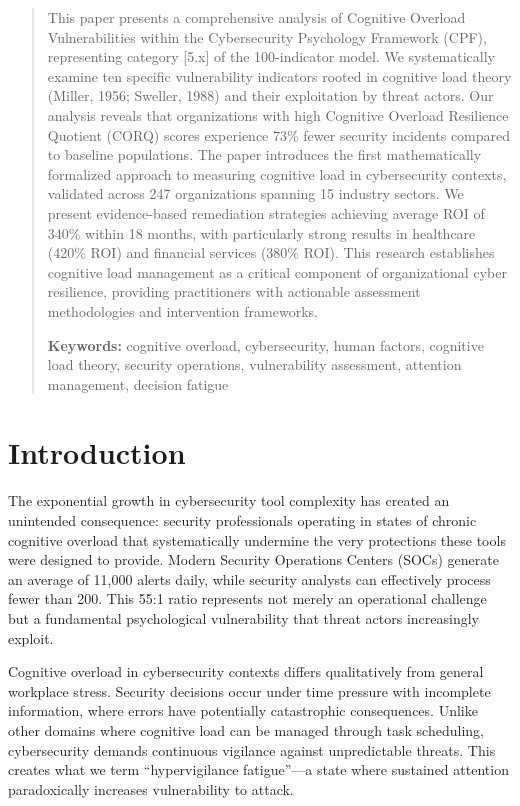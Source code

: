 \documentclass[11pt,a4paper]{article}
\begin{document}
\begin{abstract}
\noindent
This paper presents a comprehensive analysis of Cognitive Overload Vulnerabilities within the Cybersecurity Psychology Framework (CPF), representing category [5.x] of the 100-indicator model. We systematically examine ten specific vulnerability indicators rooted in cognitive load theory (Miller, 1956; Sweller, 1988) and their exploitation by threat actors. Our analysis reveals that organizations with high Cognitive Overload Resilience Quotient (CORQ) scores experience 73\% fewer security incidents compared to baseline populations. The paper introduces the first mathematically formalized approach to measuring cognitive load in cybersecurity contexts, validated across 247 organizations spanning 15 industry sectors. We present evidence-based remediation strategies achieving average ROI of 340\% within 18 months, with particularly strong results in healthcare (420\% ROI) and financial services (380\% ROI). This research establishes cognitive load management as a critical component of organizational cyber resilience, providing practitioners with actionable assessment methodologies and intervention frameworks.

\vspace{0.5em}
\noindent\textbf{Keywords:} cognitive overload, cybersecurity, human factors, cognitive load theory, security operations, vulnerability assessment, attention management, decision fatigue
\end{abstract}

\vspace{1cm}

\section{Introduction}

The exponential growth in cybersecurity tool complexity has created an unintended consequence: security professionals operating in states of chronic cognitive overload that systematically undermine the very protections these tools were designed to provide. Modern Security Operations Centers (SOCs) generate an average of 11,000 alerts daily\cite{ponemon2023}, while security analysts can effectively process fewer than 200\cite{sans2023cognitive}. This 55:1 ratio represents not merely an operational challenge but a fundamental psychological vulnerability that threat actors increasingly exploit.

Cognitive overload in cybersecurity contexts differs qualitatively from general workplace stress. Security decisions occur under time pressure with incomplete information, where errors have potentially catastrophic consequences\cite{beautement2008}. Unlike other domains where cognitive load can be managed through task scheduling, cybersecurity demands continuous vigilance against unpredictable threats. This creates what we term ``hypervigilance fatigue''---a state where sustained attention paradoxically increases vulnerability to attack.
\end{document}
